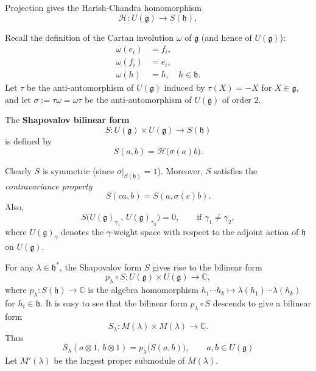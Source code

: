\documentclass[12pt]{article}
\begin{document}
Projection gives the Harish-Chandra homomorphism
\[
\mathcal{H} : U(\mathfrak{g}) \longrightarrow S(\mathfrak{h}),
\]

Recall the definition of the Cartan involution $\omega$ of $\mathfrak{g}$ (and hence of $U(\mathfrak{g})$):
\begin{align*}
\omega(e_i) & = f_i, \\
\omega(f_i) & = e_i, \\
\omega(h)   & = h, \quad h \in \mathfrak{h}.
\end{align*}
Let $\tau$ be the anti-automorphism of $U(\mathfrak{g})$ induced by $\tau(X)=-X$
for $X\in\mathfrak{g}$, and let $\sigma := \tau\omega = \omega\tau$
be the anti-automorphism of $U(\mathfrak{g})$ of order 2.


\begin{definition}
     The \textbf{Shapovalov bilinear form}
\[
S : U(\mathfrak{g}) \times U(\mathfrak{g}) \longrightarrow S(\mathfrak{h})
\]
is defined by
\[
S(a,b) = \mathcal{H}\bigl(\sigma(a)b\bigr).
\]
\end{definition}
Clearly $S$ is symmetric (since $\sigma|_{S(\mathfrak{h})} = 1$).
Moreover, $S$ satisfies the \emph{contravariance property}
\begin{equation}
S(ca,b) = S(a,\sigma(c)b).
\end{equation}
Also,
\[
S\bigl(U(\mathfrak{g})_{\gamma_1},\, U(\mathfrak{g})_{\gamma_2}\bigr) = 0,
\qquad\text{if }\gamma_1 \ne \gamma_2,
\]
where $U(\mathfrak{g})_\gamma$ denotes the $\gamma$-weight space
with respect to the adjoint action of $\mathfrak{h}$ on $U(\mathfrak{g})$.

\medskip
For any $\lambda \in \mathfrak{h}^*$,
the Shapovalov form $S$ gives rise to the bilinear form
\[
p_\lambda \circ S : U(\mathfrak{g}) \times U(\mathfrak{g}) \longrightarrow \mathbb{C},
\]
where $p_\lambda : S(\mathfrak{h}) \to \mathbb{C}$ is the algebra homomorphism $h_1 \cdots h_k \mapsto \lambda(h_1)\cdots \lambda(h_k)$ for $h_i \in \mathfrak{h}$.
It is easy to see that the bilinear form $p_\lambda \circ S$ descends to give a bilinear form
\[
S_\lambda : M(\lambda) \times M(\lambda) \longrightarrow \mathbb{C}.
\]
Thus
\begin{equation}
S_\lambda(a \otimes 1,\, b \otimes 1)
= p_\lambda\bigl(S(a,b)\bigr),
\qquad a,b \in U(\mathfrak{g})
\end{equation}
Let $M'(\lambda)$ be the largest proper submodule of $M(\lambda)$. 
\end{document}
